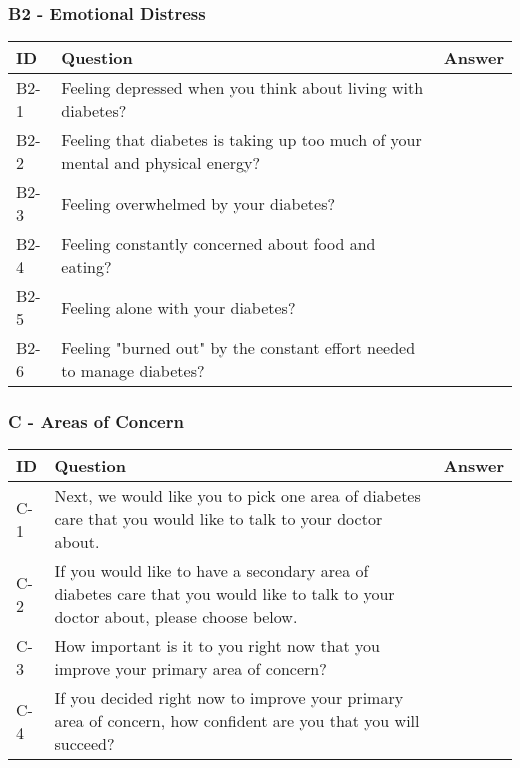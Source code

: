 \subsubsection{B2 - Emotional Distress}
\begin{table}[H]
    \centering
    \renewcommand{\arraystretch}{1.2}
    \begin{tabularx}{\textwidth}{|l|X|l|}
        \hline
        \textbf{ID} & \textbf{Question} & \textbf{Answer} \\ \hline
        B2-1 & Feeling depressed when you think about living with diabetes? &  \\ \hline
        B2-2 & Feeling that diabetes is taking up too much of your mental and physical energy? &  \\ \hline
        B2-3 & Feeling overwhelmed by your diabetes? &  \\ \hline
        B2-4 & Feeling constantly concerned about food and eating? &  \\ \hline
        B2-5 & Feeling alone with your diabetes? &  \\ \hline
        B2-6 & Feeling "burned out" by the constant effort needed to manage diabetes? &  \\ \hline
    \end{tabularx}
\end{table}

\subsubsection{C - Areas of Concern}
\begin{table}[H]
    \centering
    \renewcommand{\arraystretch}{1.2}
    \begin{tabularx}{\textwidth}{|l|X|l|}
        \hline
        \textbf{ID} & \textbf{Question} & \textbf{Answer} \\ \hline
        C-1 & Next, we would like you to pick one area of diabetes care that you would like to talk to your doctor about. &  \\ \hline
        C-2 & If you would like to have a secondary area of diabetes care that you would like to talk to your doctor about, please choose below. &  \\ \hline
        C-3 & How important is it to you right now that you improve your primary area of concern? &  \\ \hline
        C-4 & If you decided right now to improve your primary area of concern, how confident are you that you will succeed? &  \\ \hline
    \end{tabularx}
\end{table}

